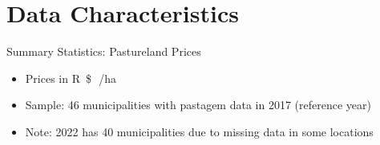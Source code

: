 \documentclass[aspectratio=169,11pt]{beamer}
\newcommand{\priceunit}{\si{R\$\,/ha}}
\begin{document}
\section{Data Characteristics}


\begin{frame}{Summary Statistics: Pastureland Prices}
  
  
  \vspace{0.8em}
  \begin{itemize}
    \item Prices in \priceunit{}
    \item Sample: 46 municipalities with pastagem data in 2017 (reference year)
    \item Note: 2022 has 40 municipalities due to missing data in some locations
  \end{itemize}
\end{frame}
\end{document}
